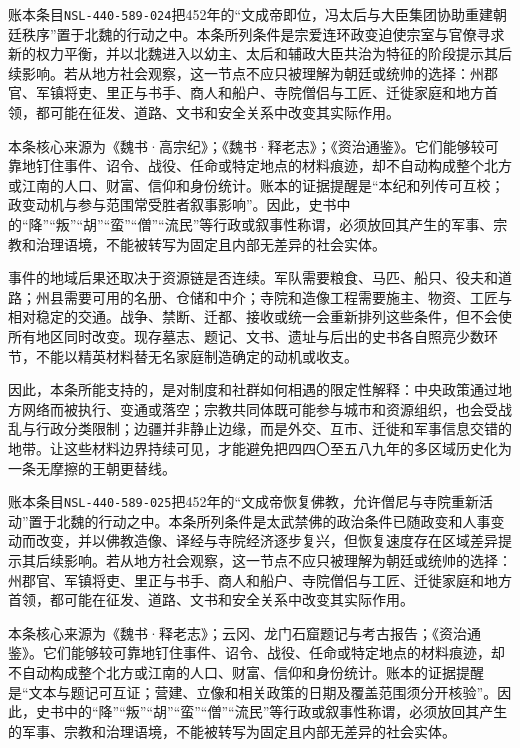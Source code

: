 账本条目\texttt{NSL-440-589-024}把452年的“文成帝即位，冯太后与大臣集团协助重建朝廷秩序”置于北魏的行动之中。本条所列条件是宗爱连环政变迫使宗室与官僚寻求新的权力平衡，并以北魏进入以幼主、太后和辅政大臣共治为特征的阶段提示其后续影响。若从地方社会观察，这一节点不应只被理解为朝廷或统帅的选择：州郡官、军镇将吏、里正与书手、商人和船户、寺院僧侣与工匠、迁徙家庭和地方首领，都可能在征发、道路、文书和安全关系中改变其实际作用。

本条核心来源为《魏书·高宗纪》；《魏书·释老志》；《资治通鉴》。它们能够较可靠地钉住事件、诏令、战役、任命或特定地点的材料痕迹，却不自动构成整个北方或江南的人口、财富、信仰和身份统计。账本的证据提醒是“本纪和列传可互校；政变动机与参与范围常受胜者叙事影响”。因此，史书中的“降”“叛”“胡”“蛮”“僧”“流民”等行政或叙事性称谓，必须放回其产生的军事、宗教和治理语境，不能被转写为固定且内部无差异的社会实体。

事件的地域后果还取决于资源链是否连续。军队需要粮食、马匹、船只、役夫和道路；州县需要可用的名册、仓储和中介；寺院和造像工程需要施主、物资、工匠与相对稳定的交通。战争、禁断、迁都、接收或统一会重新排列这些条件，但不会使所有地区同时改变。现存墓志、题记、文书、遗址与后出的史书各自照亮少数环节，不能以精英材料替无名家庭制造确定的动机或收支。

因此，本条所能支持的，是对制度和社群如何相遇的限定性解释：中央政策通过地方网络而被执行、变通或落空；宗教共同体既可能参与城市和资源组织，也会受战乱与行政分类限制；边疆并非静止边缘，而是外交、互市、迁徙和军事信息交错的地带。让这些材料边界持续可见，才能避免把四四〇至五八九年的多区域历史化为一条无摩擦的王朝更替线。

账本条目\texttt{NSL-440-589-025}把452年的“文成帝恢复佛教，允许僧尼与寺院重新活动”置于北魏的行动之中。本条所列条件是太武禁佛的政治条件已随政变和人事变动而改变，并以佛教造像、译经与寺院经济逐步复兴，但恢复速度存在区域差异提示其后续影响。若从地方社会观察，这一节点不应只被理解为朝廷或统帅的选择：州郡官、军镇将吏、里正与书手、商人和船户、寺院僧侣与工匠、迁徙家庭和地方首领，都可能在征发、道路、文书和安全关系中改变其实际作用。

本条核心来源为《魏书·释老志》；云冈、龙门石窟题记与考古报告；《资治通鉴》。它们能够较可靠地钉住事件、诏令、战役、任命或特定地点的材料痕迹，却不自动构成整个北方或江南的人口、财富、信仰和身份统计。账本的证据提醒是“文本与题记可互证；营建、立像和相关政策的日期及覆盖范围须分开核验”。因此，史书中的“降”“叛”“胡”“蛮”“僧”“流民”等行政或叙事性称谓，必须放回其产生的军事、宗教和治理语境，不能被转写为固定且内部无差异的社会实体。

